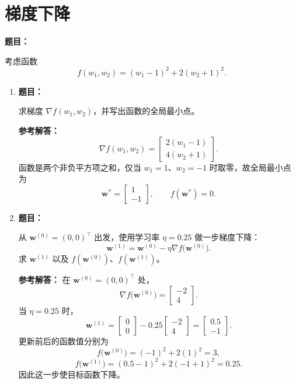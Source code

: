 \documentclass[11pt,a4paper]{article}
\newcommand{\grad}{\nabla}
\newcommand{\ans}{\textcolor{answerblue}{\textbf{参考解答：}}}
\newenvironment{question}{%
  \par\begingroup\color{black!82}\noindent\textbf{题目：}\ignorespaces
}{%
  \par\endgroup\smallskip
}
\begin{document}
\section{梯度下降}

\begin{question}
考虑函数
\[
  f(w_1,w_2)=(w_1-1)^2+2(w_2+1)^2.
\]
\end{question}

\begin{enumerate}
  \item
  \begin{question}
  求梯度 $\grad f(w_1,w_2)$，并写出函数的全局最小点。
  \end{question}
  \ans
  \[
    \grad f(w_1,w_2)
    =\begin{bmatrix}
       2(w_1-1)\\
       4(w_2+1)
     \end{bmatrix}.
  \]
  函数是两个非负平方项之和，仅当 $w_1=1$、$w_2=-1$ 时取零，故全局最小点为
  \[
    \boxed{\bm w^*=\begin{bmatrix}1\\-1\end{bmatrix}},
    \qquad f(\bm w^*)=0.
  \]

  \item
  \begin{question}
  从 $\bm w^{(0)}=(0,0)^\top$ 出发，使用学习率 $\eta=0.25$ 做一步梯度下降：
  \[
    \bm w^{(1)}=\bm w^{(0)}-\eta\grad f\bigl(\bm w^{(0)}\bigr).
  \]
  求 $\bm w^{(1)}$ 以及 $f(\bm w^{(0)})$、$f(\bm w^{(1)})$。
  \end{question}
  \ans
  在 $\bm w^{(0)}=(0,0)^\top$ 处，
  \[
    \grad f\bigl(\bm w^{(0)}\bigr)
    =\begin{bmatrix}-2\\4\end{bmatrix}.
  \]
  当 $\eta=0.25$ 时，
  \[
    \bm w^{(1)}
    =\begin{bmatrix}0\\0\end{bmatrix}
     -0.25\begin{bmatrix}-2\\4\end{bmatrix}
    =\boxed{\begin{bmatrix}0.5\\-1\end{bmatrix}}.
  \]
  更新前后的函数值分别为
  \[
    f\bigl(\bm w^{(0)}\bigr)=(-1)^2+2(1)^2=3,
  \]
  \[
    f\bigl(\bm w^{(1)}\bigr)=(0.5-1)^2+2(-1+1)^2
    =\boxed{0.25}.
  \]
  因此这一步使目标函数下降。


\end{enumerate}
\end{document}

